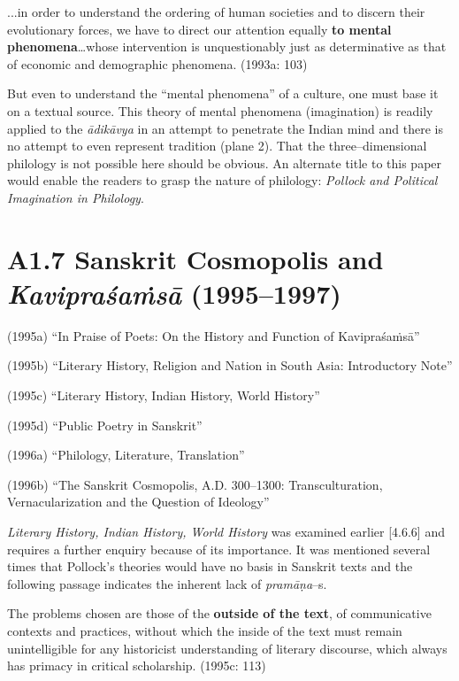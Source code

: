 \begin{myquote}
...in order to understand the ordering of human societies and to discern their evolutionary forces, we have to direct our attention equally \textbf{to mental phenomena}…whose intervention is unquestionably just as determinative as that of economic and demographic phenomena. (1993a: 103)
\end{myquote}

But even to understand the “mental phenomena” of a culture, one must base it on a textual source. This theory of mental phenomena (imagination) is readily applied to the \textit{ādikāvya} in an attempt to penetrate the Indian mind and there is no attempt to even represent tradition (plane 2). That the three–dimensional philology is not possible here should be obvious. An alternate title to this paper would enable the readers to grasp the nature of philology: \textit{Pollock and Political Imagination in Philology}.

\vspace{-.3cm}

\section*{A1.7 Sanskrit Cosmopolis and \textit{Kavipraśaṁsā} (1995–1997)}

(1995a) “In Praise of Poets: On the History and Function of Kavipraśaṁsā”

(1995b) “Literary History, Religion and Nation in South Asia: Introductory Note”

(1995c) “Literary History, Indian History, World History”

(1995d) “Public Poetry in Sanskrit”

(1996a) “Philology, Literature, Translation”

(1996b) “The Sanskrit Cosmopolis, A.D. 300–1300: Transculturation, Vernacularization and the Question of Ideology”

\textit{Literary History, Indian History, World History }was examined earlier [4.6.6] and requires a further enquiry because of its importance. It was mentioned several times that Pollock’s theories would have no basis in Sanskrit texts and the following passage indicates the inherent lack of \textit{pramāṇa}–s.

\begin{myquote}
The problems chosen are those of the \textbf{outside of the text}, of communicative contexts and practices, without which the inside of the text must remain unintelligible for any historicist understanding of literary discourse, which always has primacy in critical scholarship. (1995c: 113)
\end{myquote}


